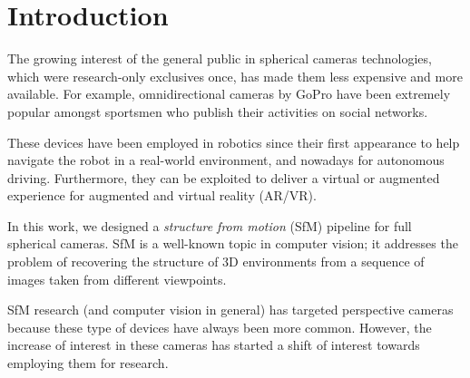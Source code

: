 \chapter{Introduction}
The growing interest of the general public in spherical cameras technologies, which were 
research-only exclusives once, has made them less expensive and more available. For example, omnidirectional cameras by GoPro have been extremely popular amongst sportsmen who publish their activities on social networks.

These devices have been employed in robotics since their first appearance to help navigate the robot in a real-world environment, and nowadays for autonomous driving. Furthermore, they can be exploited to deliver a virtual or augmented experience for augmented and virtual reality (AR/VR).

In this work, we designed a \textit{structure from motion} (SfM) pipeline for 
full spherical cameras. SfM is a well-known topic in computer vision; it addresses the problem of 
recovering the structure of 3D environments from a sequence of images taken from different viewpoints.

SfM research (and computer vision in general) has targeted perspective cameras because these type of devices have always been more common. However, the increase of interest in these cameras has started a shift of interest towards employing them for research.

